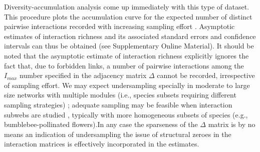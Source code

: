 \documentclass[12pt]{article}
\begin{document}
Diversity-accumulation analysis \citep{Magurran:1988mm,Hortal:2006dc} come up immediately with this type of dataset. This procedure plots the accumulation curve for the expected number of distinct pairwise interactions recorded with increasing sampling effort \citep{Jordano:2009c,Olesen:2011a}. Asymptotic estimates of interaction richness and its associated standard errors and confidence intervals can thus be obtained \citep{Hortal:2006dc} (see Supplementary Online Material). It should be noted that the asymptotic estimate of interaction richness explicitly ignores the fact that, due to forbidden links, a number of pairwise interactions among the $I_{max}$ number specified in the adjacency matrix $\Delta$ cannot be recorded, irrespective of sampling effort. 
We may expect undersampling specially in moderate to large size networks with multiple modules (i.e., species subsets requiring different sampling strategies) \citep{E31/2562,Olesen:2011a,Chacoff:2012}; adequate sampling may be feasible when interaction subwebs are studied \citep{Olesen:2011a,Vizentin-Bugoni:2014hc}, typically with more homogeneous subsets of species (e.g., bumblebee-pollinated flowers).In any case the sparseness of the $\Delta$ matrix is by no means an indication of undersampling the issue of structural zeroes in the interaction matrices is effectively incorporated in the estimates. 
\end{document}
